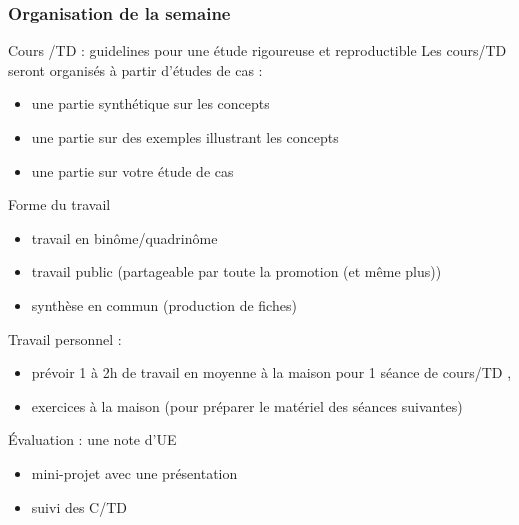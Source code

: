 \documentclass[xcolor=x11names,compress,8pt]{beamer}
\renewcommand{\(}{\begin{columns}}
\renewcommand{\)}{\end{columns}}
\newcommand{\<}[1]{\begin{column}{#1}}
\renewcommand{\>}{\end{column}}
\begin{document}
\begin{frame}
\frametitle{Organisation de la semaine}
\begin{block}{Cours /TD :  \alert{guidelines} pour une étude rigoureuse et reproductible}
Les cours/TD seront organisés à partir d'études de cas :
\begin{itemize}
\item une partie synthétique sur les \alert{concepts}
\item une partie sur des  \alert{exemples} illustrant les concepts
\item une partie sur votre étude de cas 
\end{itemize}
\end{block}

\begin{block}{Forme du travail} 
\begin{itemize}
\item travail en binôme/quadrinôme 
\item travail public (partageable par toute la promotion (et même plus))
\item synthèse en commun (production de fiches)
\end{itemize}
\end{block}

\begin{block}{Travail personnel :}
\begin{itemize}
\item  prévoir 1 à 2h de travail en moyenne à la maison pour 1 séance de cours/TD ,
\item exercices à la maison (pour préparer le matériel des séances suivantes)
\end{itemize}
\end{block}
\begin{block}{Évaluation : une note d'UE}
\begin{itemize}
\item  mini-projet avec une présentation 
\item suivi des C/TD
\end{itemize}
\end{block}
\end{frame}

\end{document}
